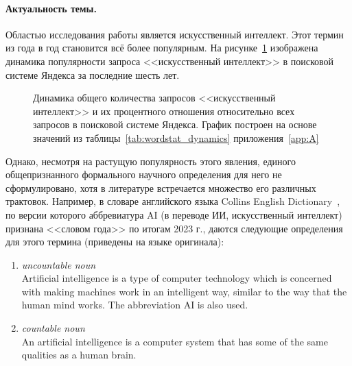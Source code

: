 \paragraph{\indent Актуальность темы.}
Областью исследования работы является искусственный интеллект. Этот термин из года в год становится всё более популярным. На рисунке~\cref{fig:wordstat_dynamics} изображена динамика популярности запроса <<искусственный интеллект>> в поисковой системе Яндекса за последние шесть лет.

\begin{figure}[h!]
    \caption{Динамика общего количества запросов <<искусственный интеллект>> и их процентного отношения относительно всех запросов в поисковой системе Яндекса. График построен на основе значений из таблицы~\cref{tab:wordstat_dynamics} приложения~\cref{app:A}}\label{fig:wordstat_dynamics}
\end{figure}

Однако, несмотря на растущую популярность этого явления, единого общепризнанного формального научного определения для него не сформулировано, хотя в литературе встречается множество его различных трактовок. Например, в словаре английского языка Collins English Dictionary~\cite{collins2023}, по версии которого аббревиатура AI (в переводе ИИ, искусственный интеллект) признана <<словом года>> по итогам 2023 г., даются следующие определения для этого термина (приведены на языке оригинала):
\begin{enumerate}
\item \textit{uncountable noun} \\
	Artificial intelligence is a type of computer technology which is concerned with making machines work in an intelligent way, similar to the way that the human mind works. The abbreviation AI is also used.
\item \textit{countable noun} \\
	An artificial intelligence is a computer system that has some of the same qualities as a human brain.
\end{enumerate}



